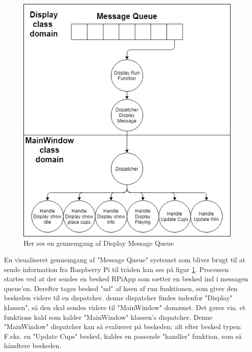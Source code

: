 \documentclass[Softwaredesign/Softwaredesign_main.tex]{subfiles}
\begin{document}
\begin{figure}[H]
    \centering
    \includegraphics[scale=0.5]{Softwaredesign/GUI/Pictures/Display_MsgQ.png}
    \caption{Her ses en gennemgang af Display Message Queue}
    \label{displaymsgq}
\end{figure}

En visualiseret gennemgang af "Message Queue" systemet som bliver brugt til at sende information fra Raspberry Pi til tråden kan ses på figur \ref{displaymsgq}. Processen startes ved at der sendes en besked RPiApp som sætter en besked ind i messagen queue'en. Derefter tages besked "ud" af køen af run funktionen, som giver den beskeden videre til en dispatcher. denne dispatcher findes indenfor "Display" klassen", så den skal sendes videre til "MainWindow" domænet. Det gøres via. et funktions kald som kalder "MainWindow" klassen's dispatcher.  Denne "MainWindow" dispatcher kan så evaluerer på beskeden; alt efter besked typen: F.eks. en "Update Cups" besked, kaldes en passende "handler" funktion, som så håndtere beskeden. 
\end{document}
